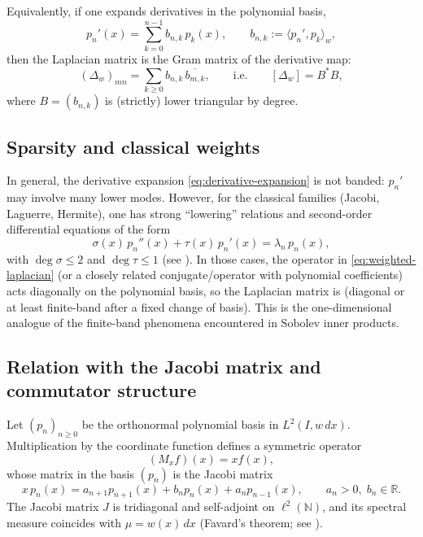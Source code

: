 \documentclass{amsart}
\numberwithin{equation}{section}
\theoremstyle{definition}
\theoremstyle{remark}
\begin{document}
Equivalently, if one expands derivatives in the polynomial basis,
\begin{equation}\label{eq:derivative-expansion}
p_n'(x)=\sum_{k=0}^{n-1} b_{n,k}\,p_k(x),
\qquad b_{n,k}:=\langle p_n',p_k\rangle_w,
\end{equation}
then the Laplacian matrix is the Gram matrix of the derivative map:
\begin{equation}\label{eq:Delta-BtB}
(\Delta_w)_{mn}=\sum_{k\ge0} b_{n,k}\,\overline{b_{m,k}},
\qquad\text{i.e.}\qquad [\Delta_w]=B^*B,
\end{equation}
where $B=(b_{n,k})$ is (strictly) lower triangular by degree.

\subsection{Sparsity and classical weights}

In general, the derivative expansion \eqref{eq:derivative-expansion} is not banded:
$p_n'$ may involve many lower modes. However, for the classical families (Jacobi, Laguerre, Hermite),
one has strong ``lowering'' relations and second-order differential equations of the form
\begin{equation}\label{eq:classical-ODE}
\sigma(x)\,p_n''(x)+\tau(x)\,p_n'(x)=\lambda_n\,p_n(x),
\end{equation}
with $\deg\sigma\le 2$ and $\deg\tau\le 1$ (see \cite{Szego,Chihara}).
In those cases, the operator in \eqref{eq:weighted-laplacian} (or a closely related conjugate/operator
with polynomial coefficients) acts diagonally on the polynomial basis, so the Laplacian matrix is
(diagonal or at least finite-band after a fixed change of basis).
This is the one-dimensional analogue of the finite-band phenomena encountered in Sobolev inner products.


\subsection{Relation with the Jacobi matrix and commutator structure}
\label{subsec:jacobi-laplacian}

Let $(p_n)_{n\ge0}$ be the orthonormal polynomial basis in $L^2(I,w\,dx)$.
Multiplication by the coordinate function defines a symmetric operator
\[
(M_x f)(x)=x f(x),
\]
whose matrix in the basis $(p_n)$ is the Jacobi matrix
\begin{equation}\label{eq:jacobi-matrix}
x\,p_n(x)=a_{n+1}p_{n+1}(x)+b_n p_n(x)+a_n p_{n-1}(x),
\qquad a_n>0,\; b_n\in\mathbb R.
\end{equation}
The Jacobi matrix $J$ is tridiagonal and self-adjoint on $\ell^2(\mathbb N)$,
and its spectral measure coincides with $\mu=w(x)\,dx$
(Favard's theorem; see \cite{Szego,Chihara,SimonOPUC1}).
\end{document}
